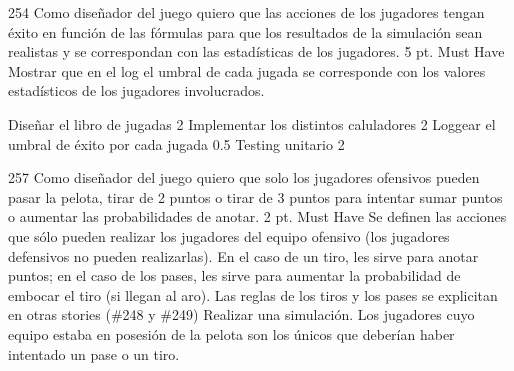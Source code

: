 \vspace{1cm}


\sprintstory
{254}
{Como diseñador del juego quiero que las acciones de los jugadores tengan éxito en función de las fórmulas para que los resultados de la simulación sean realistas y se correspondan con las estadísticas de los jugadores.}
{5 pt.}
{Must Have}
{}
{Mostrar que en el log el umbral de cada jugada se corresponde con los valores estadísticos de los jugadores involucrados.}

\begin{taskstable}
 \task
 {Diseñar el libro de jugadas}
 {2}
 \task
 {Implementar los distintos caluladores}
 {2}
 \task
 {Loggear el umbral de éxito por cada jugada}
 {0.5}
 \task
 {Testing unitario}
 {2}
\end{taskstable}

\vspace{1cm}


\sprintstory
{257}
{Como diseñador del juego quiero que solo los jugadores ofensivos pueden pasar la pelota, tirar de 2 puntos o tirar de 3 puntos para intentar sumar puntos o aumentar las probabilidades de anotar.}
{2 pt.}
{Must Have}
{Se definen las acciones que sólo pueden realizar los jugadores del equipo ofensivo (los jugadores defensivos no pueden realizarlas). En el caso
de un tiro, les sirve para anotar puntos; en el caso de los pases, les sirve para aumentar la probabilidad de embocar el tiro (si llegan al aro).
Las reglas de los tiros y los pases se explicitan en otras stories (\#248 y \#249)}
{Realizar una simulación. Los jugadores cuyo equipo estaba en posesión de la pelota son los únicos que deberían haber intentado un pase o un tiro.}

